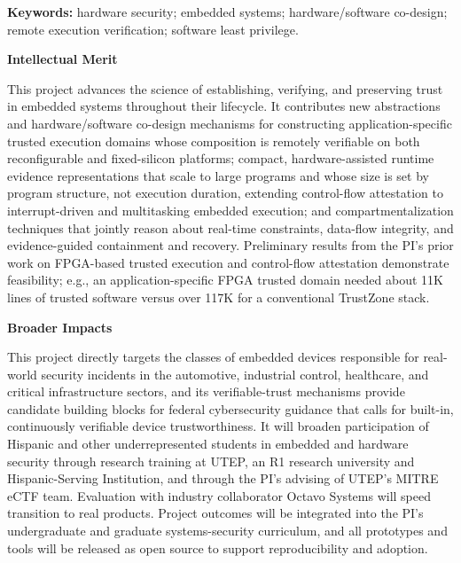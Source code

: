 \documentclass[11pt,onecolumn]{article}
\begin{document}
\noindent\textbf{Keywords:} hardware security; embedded systems; hardware/software co-design; remote execution verification; software least privilege.

\vspace{0.4em}
\noindent\textbf{Intellectual Merit}

This project advances the science of establishing, verifying, and preserving trust in embedded systems throughout their lifecycle.
It contributes new abstractions and hardware/software co-design mechanisms for constructing application-specific trusted execution domains whose composition is remotely verifiable on both reconfigurable and fixed-silicon platforms; compact, hardware-assisted runtime evidence representations that scale to large programs and whose size is set by program structure, not execution duration, extending control-flow attestation to interrupt-driven and multitasking embedded execution; and compartmentalization techniques that jointly reason about real-time constraints, data-flow integrity, and evidence-guided containment and recovery. Preliminary results from the PI's prior work on FPGA-based trusted execution and control-flow attestation demonstrate feasibility; e.g., an application-specific FPGA trusted domain needed about 11K lines of trusted software versus over 117K for a conventional TrustZone stack.

\vspace{0.4em}
\noindent\textbf{Broader Impacts}

This project directly targets the classes of embedded devices responsible for real-world security incidents in the automotive, industrial control, healthcare, and critical infrastructure sectors, and its verifiable-trust mechanisms provide candidate building blocks for federal cybersecurity guidance that calls for built-in, continuously verifiable device trustworthiness. It will broaden participation of Hispanic and other underrepresented students in embedded and hardware security through research training at UTEP, an R1 research university and Hispanic-Serving Institution, and through the PI's advising of UTEP's MITRE eCTF team. Evaluation with industry collaborator Octavo Systems will speed transition to real products. Project outcomes will be integrated into the PI's undergraduate and graduate systems-security curriculum, and all prototypes and tools will be released as open source to support reproducibility and adoption.
\end{document}
